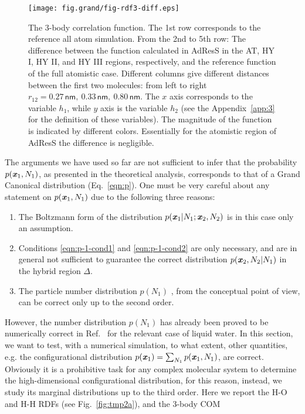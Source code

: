 \documentclass[aip,jcp,a4paper,reprint,onecolumn]{revtex4-1}
\newcommand{\redc}[1]{{\color{red} #1}}
\newcommand{\vect}[1]{\textbf{\textit{#1}}}
\newcommand{\HY}{{\Delta}}
\begin{document}
\begin{figure}
  \centering
  \texttt{[image: fig.grand/fig-rdf3-diff.eps]}
  \caption{The 3-body correlation function.  The 1st row corresponds to the reference all atom simulation.
    From the 2nd to 5th row:
    The difference between the function calculated in AdResS in the AT, HY I, HY II, and HY III
    regions, respectively, and the reference function of the full atomistic case.
    Different columns give different distances between
    the first two molecules: from left to right $r_{12} =
    0.27\,\textsf{nm},\ 0.33\,\textsf{nm},\  
    0.80\,\textsf{nm}$.  The $x$ axis corresponds to the variable $h_1$, while $y$
    axis is the variable $h_2$ (see the Appendix~\ref{app:3} for the
    definition of these variables).  The magnitude of the function is indicated by
    different colors. Essentially for the atomistic region of AdResS the difference is negligible.
  }
  \label{fig:tmp2b}
\end{figure}
The arguments we have used so far are not sufficient to infer that the probability $p(\vect x_1 , N_1)$,
as presented in the theoretical analysis, corresponds to that of a Grand Canonical distribution  (Eq.~\eqref{eqn:p}).
One must be very careful about any statement on $p(\vect x_1, N_1)$ 
due to the following three reasons:
\begin{enumerate}
\item The Boltzmann form of the distribution $p(\vect x_1|N_1; \vect x_2, N_2)$
is in this case only an \redc{assumption}.
\item Conditions \eqref{eqn:p-1-cond1} and \eqref{eqn:p-1-cond2}
are only necessary, and are in general not sufficient to guarantee
the correct distribution $p(\vect x_2, N_2 | N_1)$ in the hybrid region $\HY$.
\item The particle number distribution $p(N_1)$ , from the conceptual point of view, can be correct only up to the second order.
\end{enumerate}
However, the number distribution $p(N_1)$ has already
been proved to be numerically correct in Ref.~\cite{prlgc, rdfcorr} for the relevant case of liquid water. In this section, we want to test, with a numerical simulation, to what extent, other quantities, e.g. the configurational distribution $p(\vect x_1) = \sum_{N_1}p(\vect x_1, N_1)$, are correct. 
Obviously it is a prohibitive task for any complex molecular system to determine the high-dimensional configurational distribution,
for this reason, instead, we study its marginal distributions up to the third order.
Here we report the H-O and H-H RDFs (see Fig.~\ref{fig:tmp2a}), and the 3-body COM
\end{document}
